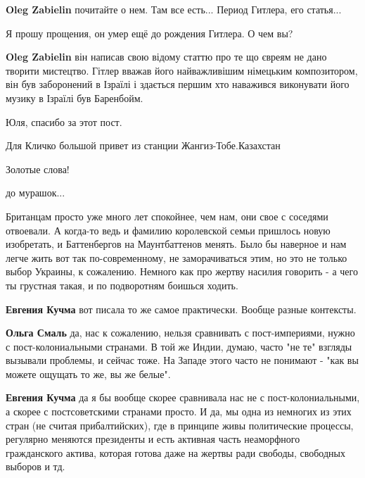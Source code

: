 \begin{itemize}
\begin{itemize}
\textbf{Oleg Zabielin} почитайте о нем. Там все есть... Период Гитлера, его статья...

Я прошу прощения, он умер ещё до рождения Гитлера. О чем вы?

\textbf{Oleg Zabielin} він написав свою відому статтю про те що євреям не дано творити мистецтво. Гітлер вважав його найважливішим німецьким композитором, він був заборонений в Ізраїлі і здається першим хто наважився виконувати його музику в Ізраїлі був Баренбойм.
\end{itemize} %


Юля, спасибо за этот пост.

Для Кличко большой привет из станции Жангиз-Тобе.Казахстан

Золотые слова!

до мурашок...


Британцам просто уже много лет спокойнее, чем нам, они свое с соседями
отвоевали. А когда-то ведь и фамилию королевской семьи пришлось новую
изобретать, и Баттенбергов на Маунтбаттенов менять. Было бы наверное и нам
легче жить вот так по-современному, не заморачиваться этим, но это не только
выбор Украины, к сожалению. Немного как про жертву насилия говорить - а чего ты
грустная такая, и по подворотням боишься ходить.

\begin{itemize} %
\textbf{Евгения Кучма} вот писала то же самое практически. Вообще разные контексты.

\textbf{Ольга Смаль} да, нас к сожалению, нельзя сравнивать с пост-империями, нужно с пост-колониальными странами. В той же Индии, думаю, часто "не те" взгляды вызывали проблемы, и сейчас тоже. На Западе этого часто не понимают - "как вы можете ощущать то же, вы же белые".

\textbf{Евгения Кучма} да я бы вообще скорее сравнивала нас не с пост-колониальными, а скорее с постсоветскими странами просто. И да, мы одна из немногих из этих стран (не считая прибалтийских), где в принципе живы политические процессы, регулярно меняются президенты и есть активная часть неаморфного гражданского актива, которая готова даже на жертвы ради свободы, свободных выборов и тд.
\end{itemize} %


\end{itemize}
